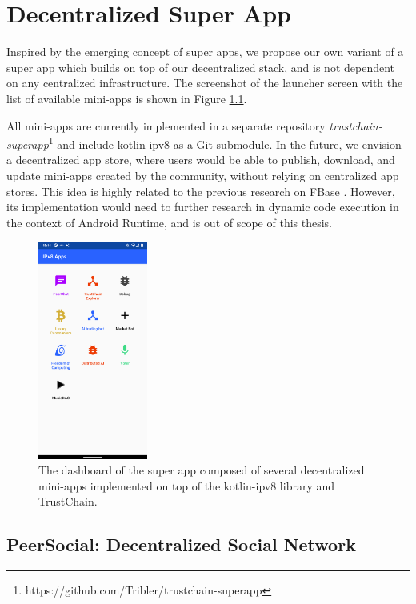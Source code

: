 \fi


\chapter{Decentralized Super App}
\label{superapp}

Inspired by the emerging concept of super apps, we propose our own variant of a super app which builds on top of our decentralized stack, and is not dependent on any centralized infrastructure. The screenshot of the launcher screen with the list of available mini-apps is shown in Figure \ref{dashboard}.

All mini-apps are currently implemented in a separate repository \textit{trustchain-superapp}\footnote{https://github.com/Tribler/trustchain-superapp} and include kotlin-ipv8 as a Git submodule. In the future, we envision a decentralized app store, where users would be able to publish, download, and update mini-apps created by the community, without relying on centralized app stores. This idea is highly related to the previous research on FBase \cite{fbase}. However, its implementation would need to further research in dynamic code execution in the context of Android Runtime, and is out of scope of this thesis.

\begin{figure}
    \centering
    \includegraphics[width=0.32\textwidth]{screens/superapp/superapp}
    \caption{The dashboard of the super app composed of several decentralized mini-apps implemented on top of the kotlin-ipv8 library and TrustChain.}
    \label{dashboard}
\end{figure}

\section{PeerSocial: Decentralized Social Network}

